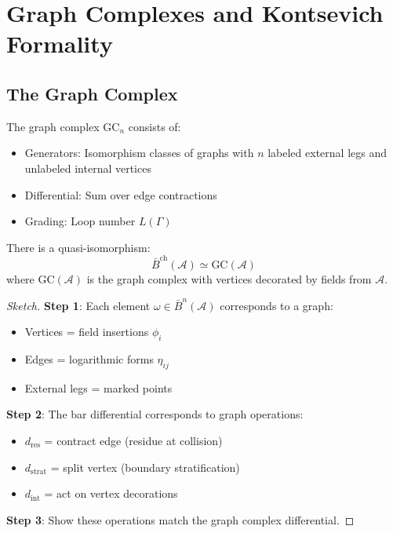 \section{Graph Complexes and Kontsevich Formality}

\subsection{The Graph Complex}

\begin{definition}
The graph complex $\text{GC}_n$ consists of:
\begin{itemize}
\item Generators: Isomorphism classes of graphs with $n$ labeled external legs 
and unlabeled internal vertices
\item Differential: Sum over edge contractions
\item Grading: Loop number $L(\Gamma)$
\end{itemize}
\end{definition}

\begin{theorem}[Bar Complex = Graph Complex]
There is a quasi-isomorphism:
$$\bar{B}^{\text{ch}}(\mathcal{A}) \simeq \text{GC}(\mathcal{A})$$
where $\text{GC}(\mathcal{A})$ is the graph complex with vertices decorated by 
fields from $\mathcal{A}$.
\end{theorem}

\begin{proof}[Sketch]
\textbf{Step 1}: Each element $\omega \in \bar{B}^n(\mathcal{A})$ corresponds to 
a graph:
\begin{itemize}
\item Vertices = field insertions $\phi_i$
\item Edges = logarithmic forms $\eta_{ij}$
\item External legs = marked points
\end{itemize}

\textbf{Step 2}: The bar differential corresponds to graph operations:
\begin{itemize}
\item $d_{\text{res}}$ = contract edge (residue at collision)
\item $d_{\text{strat}}$ = split vertex (boundary stratification)
\item $d_{\text{int}}$ = act on vertex decorations
\end{itemize}

\textbf{Step 3}: Show these operations match the graph complex differential.
\end{proof}

